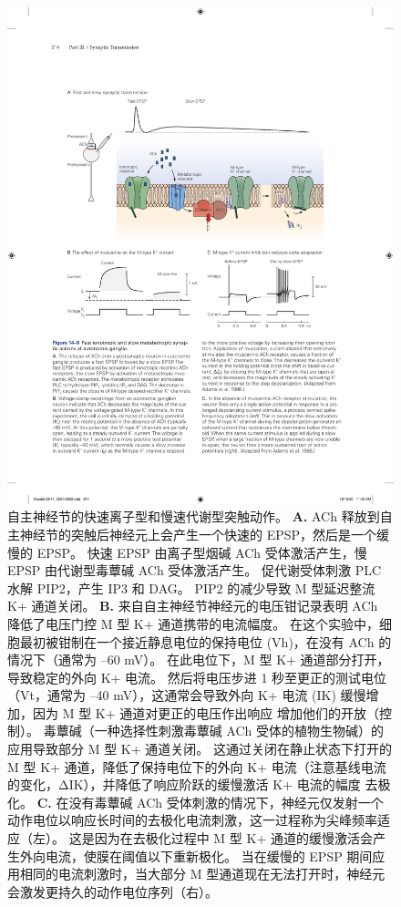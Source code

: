 \begin{figure}[htbp]
	\centering
	\includegraphics[width=0.8\linewidth]{chap14/fig_14_8}
	\caption{自主神经节的快速离子型和慢速代谢型突触动作。
		\textbf{A.} ACh 释放到自主神经节的突触后神经元上会产生一个快速的 EPSP，然后是一个缓慢的 EPSP。
		快速 EPSP 由离子型烟碱 ACh 受体激活产生，慢 EPSP 由代谢型毒蕈碱 ACh 受体激活产生。
		促代谢受体刺激 PLC 水解 PIP2，产生 IP3 和 DAG。 PIP2 的减少导致 M 型延迟整流 K+ 通道关闭。
		\textbf{B.} 来自自主神经节神经元的电压钳记录表明 ACh 降低了电压门控 M 型 K+ 通道携带的电流幅度。
		在这个实验中，细胞最初被钳制在一个接近静息电位的保持电位 (Vh)，在没有 ACh 的情况下（通常为 –60 mV）。
		在此电位下，M 型 K+ 通道部分打开，导致稳定的外向 K+ 电流。
		然后将电压步进 1 秒至更正的测试电位（Vt，通常为 –40 mV），这通常会导致外向 K+ 电流 (IK) 缓慢增加，因为 M 型 K+ 通道对更正的电压作出响应 增加他们的开放（控制）。
		毒蕈碱（一种选择性刺激毒蕈碱 ACh 受体的植物生物碱）的应用导致部分 M 型 K+ 通道关闭。
		这通过关闭在静止状态下打开的 M 型 K+ 通道，降低了保持电位下的外向 K+ 电流（注意基线电流的变化，ΔIK），并降低了响应阶跃的缓慢激活 K+ 电流的幅度 去极化\cite{adams1986slow}。
		\textbf{C.} 在没有毒蕈碱 ACh 受体刺激的情况下，神经元仅发射一个动作电位以响应长时间的去极化电流刺激，这一过程称为尖峰频率适应（左）。
		这是因为在去极化过程中 M 型 K+ 通道的缓慢激活会产生外向电流，使膜在阈值以下重新极化。
		当在缓慢的 EPSP 期间应用相同的电流刺激时，当大部分 M 型通道现在无法打开时，神经元会激发更持久的动作电位序列（右）\cite{adams1986slow}。}
	\label{fig:14_8}
\end{figure}


